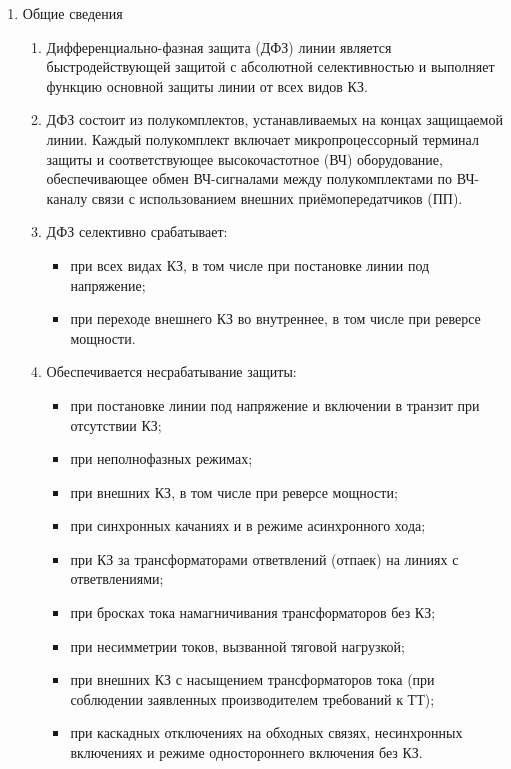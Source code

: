 \color{black}

\begin{enumerate}

\item Общие сведения

\begin{enumerate}

\item
Дифференциально-фазная защита (ДФЗ) линии является быстродействующей защитой с абсолютной селективностью и выполняет функцию основной защиты линии от всех видов КЗ.

\item
ДФЗ состоит из полукомплектов, устанавливаемых на концах защищаемой линии. 
Каждый полукомплект включает микропроцессорный терминал защиты и соответствующее высокочастотное (ВЧ) оборудование, обеспечивающее обмен ВЧ-сигналами между полукомплектами по ВЧ-каналу связи с использованием внешних приёмопередатчиков (ПП).

\item 
ДФЗ селективно срабатывает:
\begin{itemize}
    \item при всех видах КЗ, в том числе при постановке линии под напряжение; 
    \item при переходе внешнего КЗ во внутреннее, в том числе при реверсе мощности.
\end{itemize}

\item 
Обеспечивается несрабатывание защиты:
\begin{itemize} 
\item при постановке линии под напряжение и включении в транзит при отсутствии КЗ;
\item при неполнофазных режимах;
\item при внешних КЗ, в том числе при реверсе мощности;
\item при синхронных качаниях и в режиме асинхронного хода;
\item при КЗ за трансформаторами ответвлений (отпаек) на линиях с ответвлениями;
\item при бросках тока намагничивания трансформаторов без КЗ;
\item при несимметрии токов, вызванной тяговой нагрузкой;
\item при внешних КЗ с насыщением трансформаторов тока (при соблюдении заявленных производителем требований к ТТ);
\item при каскадных отключениях на обходных связях, несинхронных включениях и режиме одностороннего включения без КЗ.
\end{itemize}


\end{enumerate}
\end{enumerate}

